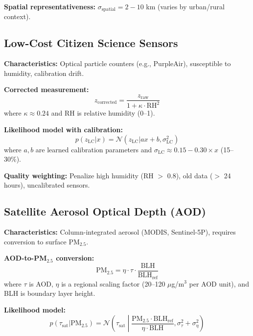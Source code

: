 \documentclass[11pt,letterpaper]{article}
\newcommand{\Normal}{\mathcal{N}}
\begin{document}
\textbf{Spatial representativeness:} $\sigma_{\text{spatial}} = 2-10$ km (varies by urban/rural context).

\subsection{Low-Cost Citizen Science Sensors}

\textbf{Characteristics:} Optical particle counters (e.g., PurpleAir), susceptible to humidity, calibration drift.

\textbf{Corrected measurement:}
\begin{equation}
z_{\text{corrected}} = \frac{z_{\text{raw}}}{1 + \kappa \cdot \text{RH}^2}
\label{eq:lcs_correction}
\end{equation}
where $\kappa \approx 0.24$ and RH is relative humidity (0--1).

\textbf{Likelihood model with calibration:}
\begin{equation}
p(z_{\text{LC}} | x) = \Normal(z_{\text{LC}} | ax + b, \sigma^2_{\text{LC}})
\label{eq:lcs_likelihood}
\end{equation}
where $a, b$ are learned calibration parameters and $\sigma_{\text{LC}} \approx 0.15-0.30 \times x$ (15--30\%).

\textbf{Quality weighting:} Penalize high humidity (RH $>$ 0.8), old data ($>$ 24 hours), uncalibrated sensors.

\subsection{Satellite Aerosol Optical Depth (AOD)}

\textbf{Characteristics:} Column-integrated aerosol (MODIS, Sentinel-5P), requires conversion to surface PM$_{2.5}$.

\textbf{AOD-to-PM$_{2.5}$ conversion:}
\begin{equation}
\text{PM}_{2.5} = \eta \cdot \tau \cdot \frac{\text{BLH}}{\text{BLH}_{\text{ref}}}
\label{eq:aod_conversion}
\end{equation}
where $\tau$ is AOD, $\eta$ is a regional scaling factor (20--120 $\mu$g/m$^3$ per AOD unit), and BLH is boundary layer height.

\textbf{Likelihood model:}
\begin{equation}
p(\tau_{\text{sat}} | \text{PM}_{2.5}) = \Normal\left(\tau_{\text{sat}} \middle| \frac{\text{PM}_{2.5} \cdot \text{BLH}_{\text{ref}}}{\eta \cdot \text{BLH}}, \sigma^2_{\tau} + \sigma^2_{\eta}\right)
\label{eq:sat_likelihood}
\end{equation}
\end{document}

